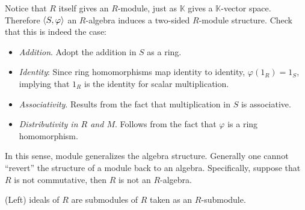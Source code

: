 \documentclass{article}
\begin{document}
\begin{remark}
    Notice that $R$ itself gives an $R$-module, just as $\mathbb{K}$ gives a $\mathbb{K}$-vector space. Therefore $\left\langle S, \varphi \right\rangle$ an $R$-algebra induces a two-sided $R$-module structure. Check that this is indeed the case:
    \begin{itemize}
        \item \emph{Addition}. Adopt the addition in $S$ as a ring.
        \item \emph{Identity}: Since ring homomorphisms map identity to identity, $\varphi(1_R) = 1_S$, implying that $1_R$ is the identity for scalar multiplication.
        \item \emph{Associativity}. Results from the fact that multiplication in $S$ is associative.
        \item \emph{Distributivity in $R$ and $M$}. Follows from the fact that $\varphi$ is a ring homomorphism.
    \end{itemize}
    In this sense, module generalizes the algebra structure. Generally one cannot ``revert'' the structure of a module back to an algebra. Specifically, suppose that $R$ is not commutative, then $R$ is not an $R$-algebra.
\end{remark}

\begin{remark}
    (Left) ideals of $R$ are submodules of $R$ taken as an $R$-submodule.
\end{remark}
\end{document}
